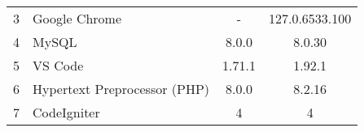 \begin{enumerate}
\begin{longtable}{clcc}
		      3                               & Google Chrome                & -                                          & 127.0.6533.100                              \\
		      4                               & MySQL                        & 8.0.0                                      & 8.0.30                                      \\
		      5                               & VS Code                      & 1.71.1                                     & 1.92.1                                      \\
		      6                               & Hypertext Preprocessor (PHP) & 8.0.0                                      & 8.2.16                                      \\
		      7                               & CodeIgniter                  & 4                                          & 4                                           \\ \hline
	      \end{longtable}


\end{enumerate}

